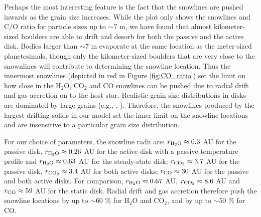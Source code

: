 \documentclass[apj]{emulateapj}
\newcommand{\emgr}[1]{\emph{ \color{gray} #1}}
\begin{document}
Perhaps the most interesting feature is the fact that the snowlines are pushed inwards as the grain size increases. While the plot only shows the snowlines and C/O ratio for particle sizes up to $\sim$7 m, we have found that almost kilometer-sized boulders are able to drift and desorb for both the passive and the active disk. Bodies larger than $\sim$7 m evaporate at the same location as the meter-sized planetesimals, though only the kilometer-sized boulders that are very close to the snownlines will contribute to determining the snowline location. Thus the innermost snowlines (depicted in red in Figure \ref{fig:CO_ratio}) set the limit on how close in the H$_2$O, CO$_2$ and CO snowlines can be pushed due to radial drift and gas accretion on to the host star. Realistic grain size distributions in disks are dominated by large grains (e.g., \citealt{dalessio01}, \citealt{birnstiel12}). Therefore, the snowlines produced by the largest drifting solids in our model set the inner limit on the snowline locations and are insensitive to a particular grain size distribution. 

For our choice of parameters, the snowline radii are: $r_{\rm{H_2O}} \approx 0.3$ AU for the passive disk, $r_{\rm{H_2O}} \approx 0.26$ AU for the active disk with a passive temperature profile and $r_{\rm{H_2O}} \approx 0.63$ AU for the steady-state disk; $r_{\rm{CO_2}} \approx 3.7$ AU for the passive disk, $r_{\rm{CO_2}} \approx 3.4$ AU for both active disks; $r_{\rm{CO}} \approx 30$ AU for the passive and both active disks. For comparison, $r_{\rm{H_2O}} \approx 0.67$ AU, $r_{\rm{CO_2}} \approx 8.6$ AU and $r_{\rm{CO}} \approx 59$ AU for the static disk. Radial drift and gas accretion therefore push the snowline locations by up to $\sim$$60$ \% for H$_2$O and CO$_2$, and by up to $\sim$$50$ \% for CO.  







\end{document}
